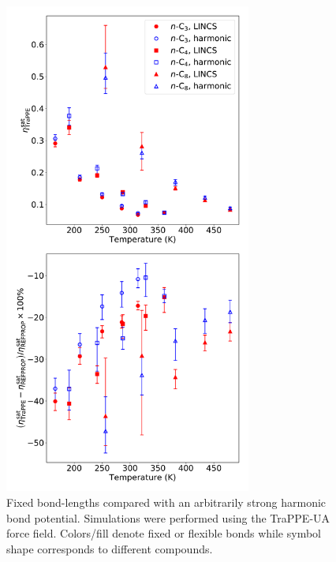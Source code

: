 \documentclass[preprint,review,12pt]{elsarticle}
\begin{document}
	\begin{figure}[htb!]
		\centering
		\includegraphics[width=3.2in]{nAlkanes_TraPPE_BondType.pdf}
		\caption{Fixed bond-lengths compared with an arbitrarily strong harmonic bond potential. Simulations were performed using the TraPPE-UA force field. Colors/fill denote fixed or flexible bonds while symbol shape corresponds to different compounds.}
		\label{fig:fixed_flexible}
	\end{figure} 

%	
%	
	
\end{document}
